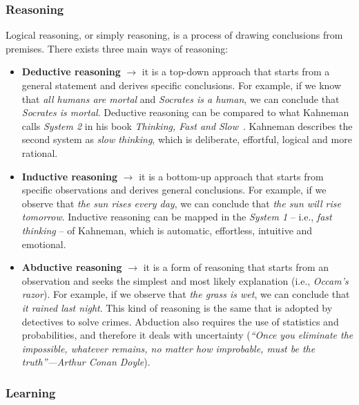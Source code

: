 \subsubsection{Reasoning}\label{subsubsec:reasoning}
%
Logical reasoning, or simply reasoning, is a process of drawing conclusions from premises.
%
There exists three main ways of reasoning:
%
\begin{itemize}
    \item \textbf{Deductive reasoning} $\rightarrow$ it is a top-down approach that starts from a general statement and derives specific conclusions.
    For example, if we know that \emph{all humans are mortal} and \emph{Socrates is a human}, we can conclude that \emph{Socrates is mortal}.
    Deductive reasoning can be compared to what Kahneman calls \emph{System 2} in his book \emph{Thinking, Fast and Slow}~\cite{kahneman2011thinking}.
    Kahneman describes the second system as \emph{slow thinking}, which is deliberate, effortful, logical and more rational.
    \item \textbf{Inductive reasoning} $\rightarrow$ it is a bottom-up approach that starts from specific observations and derives general conclusions.
    For example, if we observe that \emph{the sun rises every day}, we can conclude that \emph{the sun will rise tomorrow}.
    Inductive reasoning can be mapped in the \emph{System 1} -- i.e., \emph{fast thinking} -- of Kahneman, which is automatic, effortless, intuitive and emotional.
    \item \textbf{Abductive reasoning} $\rightarrow$ it is a form of reasoning that starts from an observation and seeks the simplest and most likely explanation (i.e., \emph{Occam's razor}).
    For example, if we observe that \emph{the grass is wet}, we can conclude that \emph{it rained last night}.
    This kind of reasoning is the same that is adopted by detectives to solve crimes.
    Abduction also requires the use of statistics and probabilities, and therefore it deals with uncertainty (\emph{``Once you eliminate the impossible, whatever remains, no matter how improbable, must be the truth''---Arthur Conan Doyle}).
\end{itemize}

\subsubsection{Learning}\label{subsubsec:learning}
%



